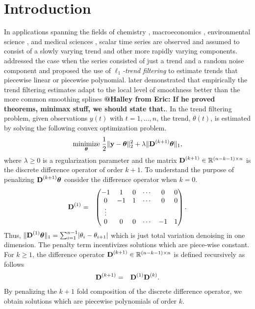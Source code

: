 \documentclass[12pt]{article}
\makeatletter
\newcommand{\Halley}[2]{{\bf {\color{purple}@Halley from #1: #2}}\xspace}
\newcommand{\Real}{\mathbb{R}}
\newcommand{\V}[1]{{\bm{\mathbf{\MakeLowercase{#1}}}}} %
\newcommand{\M}[1]{{\bm{\mathbf{\MakeUppercase{#1}}}}} %
\newcommand{\Mn}[2]{\M{#1}^{(#2)}} %
\makeatother
\begin{document}
	\newpage
	\section{Introduction}
	\label{sec:intro}
	
	In applications spanning the fields of chemistry \citep{Ning2014}, macroeconomics \citep{yamada2017estimating}, environmental science \citep{brantley2014mobile}, and medical sciences \citep{pettersson2013algorithm, marandi2015qualitative}, scalar time series are observed and assumed to consist of a slowly varying trend and other more rapidly varying components. \cite{Kim2009} addressed the case when the series consisted of just a trend and a random noise component and proposed the use of \textit{$\ell_1$-trend filtering} to estimate trends that piecewise linear or piecewise polynomial. \cite{Tib2014} later demonstrated that empirically the trend filtering estimates adapt to the local level of smoothness better than the more common smoothing splines \Halley{Eric}{If he proved theorems, minimax stuff, we should state that.}. In the trend filtering problem, given observations $y(t)$ with $t=1,\ldots,n$, the trend, $\theta(t)$, is estimated by solving the following convex optimization problem.
	\begin{eqnarray}
	\underset{\V{\theta}}{\text{minimize}}\; \frac{1}{2} \lVert \V{y} - \V{\theta} \rVert_2^2 + \lambda \lVert \Mn{D}{k+1}\V{\theta} \rVert_1,
	\end{eqnarray}
	where $\lambda \geq 0$ is a regularization parameter and the matrix $\Mn{D}{k+1} \in \Real^{(n - k -1) \times n}$ is the discrete difference operator of order $k+1$. To understand the purpose of penalizing $\Mn{D}{k+1}\V{\theta}$ consider the difference operator when $k = 0$.
	\begin{eqnarray}
	\Mn{D}{1} & = & \begin{pmatrix}
	-1 & 1 & 0 & \cdots & 0 & 0 \\
	0 & -1 & 1 & \cdots & 0 & 0 \\
	\vdots & & & & & \\
	0 & 0 & 0 & \cdots & -1 & 1 \\
	\end{pmatrix}.
	\end{eqnarray}
	Thus, $\lVert \Mn{D}{1}\V{\theta} \rVert_1 = \sum_{i=1}^{n-1} \lvert \theta_i - \theta_{i+1} \rvert$ which is just total variation denoising in one dimension. The penalty term incentivizes solutions which are piece-wise constant. For $k \geq 1$, the difference operator $\Mn{D}{k+1} \in \Real^{(n-k-1) \times n}$ is defined recursively as follows
	\begin{eqnarray}
	\Mn{D}{k+1} & = & \Mn{D}{1}\Mn{D}{k}.
	\end{eqnarray}
	By penalizing the $k+1$ fold composition of the discrete difference operator, we obtain solutions which are piecewise polynomials of order $k$. 
	
\end{document}
